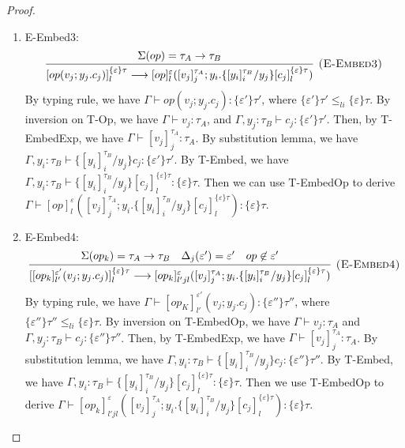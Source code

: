 \begin{lemma}
\begin{proof}
\begin{enumerate}
\item E-Embed3: 
$$
\infer[\textsc{(E-Embed3)}]
{[op(v_j; y_j.c_j)]^{\{\varepsilon\}\tau}_l \longrightarrow [op]^\varepsilon_l([v_j]^{\tau_A}_j; y_i. \{[y_i]^{\tau_B}_i / y_j\}[c_j]^{\{\varepsilon\}\tau}_l)}
{ \Sigma(op) = \tau_A \rightarrow \tau_B} 
$$
By typing rule, we have $\Gamma \vdash op(v_j; y_j.c_j) : \{\varepsilon'\}\tau'$, where $\{\varepsilon'\}\tau' \leq_{li} \{\varepsilon\}\tau$. By inversion on T-Op, we have $\Gamma \vdash v_j : \tau_A$, and $\Gamma, y_j : \tau_B \vdash c_j: \{\varepsilon'\}\tau'$. Then, by T-EmbedExp, we have $\Gamma \vdash [v_j]^{\tau_A}_j : \tau_A$. By substitution lemma, we have $\Gamma, y_i: \tau_B \vdash \{[y_i]^{\tau_B}_i/y_j\}c_j : \{\varepsilon'\}\tau'$. By T-Embed, we have $\Gamma, y_i: \tau_B \vdash \{[y_i]^{\tau_B}_i/y_j\}[c_j]^{\{\varepsilon\}\tau}_l : \{\varepsilon\}\tau$. Then we can use T-EmbedOp to derive $\Gamma \vdash [op]^\varepsilon_l([v_j]^{\tau_A}_j; y_i. \{[y_i]^{\tau_B}_i / y_j\}[c_j]^{\{\varepsilon\}\tau}_l): \{\varepsilon\}\tau$. 

\item E-Embed4:
$$
\infer[\textsc{(E-Embed4)}]
{[[op_k]^{\varepsilon'}_{l'}(v_j; y_j.c_j)]^{\{\varepsilon\}\tau}_l \longrightarrow [op_k]^\varepsilon_{l'jl}([v_j]^{\tau_A}_j; y_i. \{[y_i]^{\tau_B}_i / y_j\}[c_j]^{\{\varepsilon\}\tau}_l)}
{ \Sigma(op_k) = \tau_A \rightarrow \tau_B& \Delta_j(\varepsilon') = \varepsilon' & op \not \in \varepsilon'} 
$$
By typing rule, we have $\Gamma \vdash [op_K]^{\varepsilon'}_{l'}(v_j; y_j.c_j) : \{\varepsilon''\}\tau''$, where $\{\varepsilon''\}\tau'' \leq_{li} \{\varepsilon\}\tau$. By inversion on T-EmbedOp, we have $\Gamma \vdash v_j: \tau_A$ and $\Gamma, y_j : \tau_B \vdash c_j: \{\varepsilon''\}\tau''$. Then, by T-EmbedExp, we have $\Gamma \vdash [v_j]^{\tau_A}_j : \tau_A$.
By substitution lemma, we have $\Gamma, y_i: \tau_B \vdash \{[y_i]^{\tau_B}_i/y_j\}c_j : \{\varepsilon''\}\tau''$. By T-Embed, we have $\Gamma, y_i: \tau_B \vdash \{[y_i]^{\tau_B}_i/y_j\}[c_j]^{\{\varepsilon\}\tau}_l : \{\varepsilon\}\tau$. Then we use T-EmbedOp to derive $\Gamma \vdash [op_k]^\varepsilon_{l'jl}([v_j]^{\tau_A}_j; y_i. \{[y_i]^{\tau_B}_i / y_j\}[c_j]^{\{\varepsilon\}\tau}_l) : \{\varepsilon\}\tau$.
\end{enumerate}
\end{proof}
\end{lemma}

